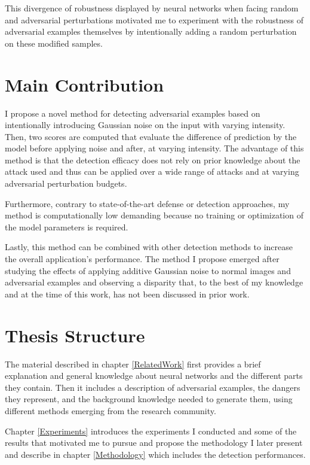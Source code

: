 This divergence of robustness displayed by neural networks when facing random
and adversarial perturbations motivated me to experiment with the robustness of
adversarial examples themselves by intentionally adding a random perturbation on
these modified samples.


\section{Main Contribution}
I propose a novel method for detecting adversarial examples based on
intentionally introducing Gaussian noise on the input with varying intensity.
Then, two scores are computed that evaluate the difference of prediction by the
model before applying noise and after, at varying intensity. The advantage of
this method is that the detection efficacy does not rely on prior knowledge
about the attack used and thus can be applied over a wide range of attacks and
at varying adversarial perturbation budgets.

Furthermore, contrary to state-of-the-art defense or detection approaches, my
method is computationally low demanding because no training or optimization of
the model parameters is required.

Lastly, this method can be combined with other detection methods to increase the
overall application's performance. The method I propose emerged after studying
the effects of applying additive Gaussian noise to normal images and adversarial
examples and observing a disparity that, to the best of my knowledge and at the
time of this work, has not been discussed in prior work.


\section{Thesis Structure}
The material described in chapter \ref{RelatedWork} first provides a brief
explanation and general knowledge about neural networks and the different parts
they contain. Then it includes a description of adversarial examples, the
dangers they represent, and the background knowledge needed to generate them,
using different methods emerging from the research community.

Chapter \ref{Experiments} introduces the experiments I conducted and some of the
results that motivated me to pursue and propose the methodology I later present
and describe in chapter \ref{Methodology} which includes the detection
performances.